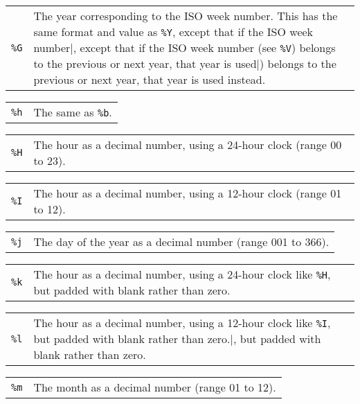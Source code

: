 \documentclass[10pt]{article}
\begin{document}
\medskip

\begin{tabular}{@{}p{20pt}p{298pt}@{}}
{\tt\%G}&The year corresponding to the ISO week number. This has the
same format and value as \verb|%Y|, except that if the ISO week number
(see \verb|%V|) belongs to the previous or next year, that year is used
instead.
\end{tabular}

\medskip

\begin{tabular}{@{}p{20pt}p{298pt}@{}}
{\tt\%h}&The same as \verb|%b|.\\
\end{tabular}

\medskip

\begin{tabular}{@{}p{20pt}p{298pt}@{}}
{\tt\%H}&The hour as a decimal number, using a 24-hour clock (range 00
to 23).\\
\end{tabular}

\medskip

\begin{tabular}{@{}p{20pt}p{298pt}@{}}
{\tt\%I}&The hour as a decimal number, using a 12-hour clock (range 01
to 12).\\
\end{tabular}

\medskip

\begin{tabular}{@{}p{20pt}p{298pt}@{}}
{\tt\%j}&The day of the year as a decimal number (range 001 to 366).\\
\end{tabular}

\medskip

\begin{tabular}{@{}p{20pt}p{298pt}@{}}
{\tt\%k}&The hour as a decimal number, using a 24-hour clock like
\verb|%H|, but padded with blank rather than zero.\\
\end{tabular}

\medskip

\begin{tabular}{@{}p{20pt}p{298pt}@{}}
{\tt\%l}&The hour as a decimal number, using a 12-hour clock like
\verb|%I|, but padded with blank rather than zero.
\end{tabular}

\medskip

\begin{tabular}{@{}p{20pt}p{298pt}@{}}
{\tt\%m}&The month as a decimal number (range 01 to 12).\\
\end{tabular}
\end{document}
